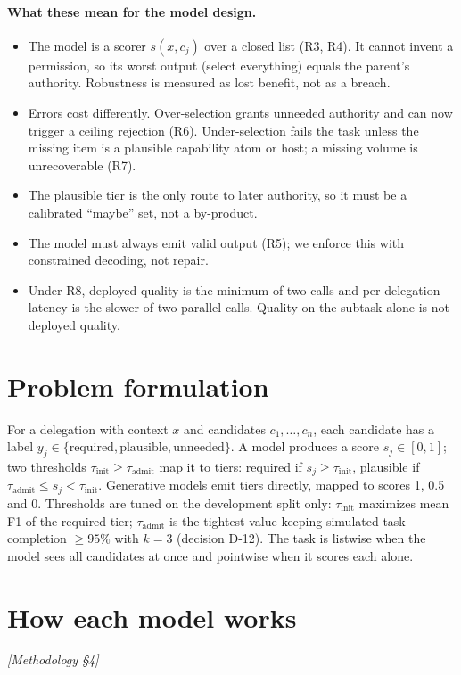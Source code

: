 \documentclass[10pt]{article}
\newcommand{\M}[1]{\textit{[Methodology #1]}}
\begin{document}
\paragraph{What these mean for the model design.}
\begin{itemize}
  \item The model is a scorer $s(x, c_j)$ over a closed list (R3, R4). It cannot invent a permission, so its worst output
    (select everything) equals the parent's authority. Robustness is measured as lost benefit, not as a breach.
  \item Errors cost differently. Over-selection grants unneeded authority and can now trigger a ceiling rejection (R6).
    Under-selection fails the task unless the missing item is a plausible capability atom or host; a missing volume is
    unrecoverable (R7).
  \item The plausible tier is the only route to later authority, so it must be a calibrated ``maybe'' set, not a by-product.
  \item The model must always emit valid output (R5); we enforce this with constrained decoding, not repair.
  \item Under R8, deployed quality is the minimum of two calls and per-delegation latency is the slower of two parallel
    calls. Quality on the subtask alone is not deployed quality.
\end{itemize}

\section{Problem formulation}\label{sec:problem}
For a delegation with context $x$ and candidates $c_1,\dots,c_n$, each candidate has a label
$y_j\in\{\text{required},\text{plausible},\text{unneeded}\}$. A model produces a score $s_j\in[0,1]$; two thresholds
$\tau_{\mathrm{init}}\ge\tau_{\mathrm{admit}}$ map it to tiers: required if $s_j\ge\tau_{\mathrm{init}}$, plausible if
$\tau_{\mathrm{admit}}\le s_j<\tau_{\mathrm{init}}$. Generative models emit tiers directly, mapped to scores 1, 0.5 and 0.
Thresholds are tuned on the development split only: $\tau_{\mathrm{init}}$ maximizes mean F1 of the required tier;
$\tau_{\mathrm{admit}}$ is the tightest value keeping simulated task completion $\ge 95\%$ with $k=3$ (decision D-12).
The task is listwise when the model sees all candidates at once and pointwise when it scores each alone.

\section{How each model works}\label{sec:models}
\M{\S4}
\end{document}
